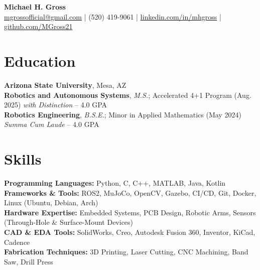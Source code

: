 \documentclass[10pt]{article}
\begin{document}
\begin{center}
    {\LARGE \textbf{Michael H. Gross}} \\
    \href{mailto:mgrossofficial@gmail.com}{mgrossofficial@gmail.com} | (520) 419-9061 | 
    \href{https://www.linkedin.com/in/mhgross}{linkedin.com/in/mhgross} | \href{https://github.com/MGross21}{github.com/MGross21}
\end{center}

\section*{Education}
\textbf{Arizona State University}, Mesa, AZ \\
\textbf{Robotics and Autonomous Systems}, \textit{M.S.}; Accelerated 4+1 Program (Aug. 2025) \hfill \textit{with Distinction} -- 4.0 GPA \\
\textbf{Robotics Engineering}, \textit{B.S.E.}; Minor in Applied Mathematics (May 2024) \hfill \textit{Summa Cum Laude} -- 4.0 GPA

\section*{Skills}
\textbf{Programming Languages:} Python, C, C++, MATLAB, Java, Kotlin \\
\textbf{Frameworks \& Tools:} ROS2, MuJoCo, OpenCV, Gazebo, CI/CD, Git, Docker, Linux (Ubuntu, Debian, Arch) \\
\textbf{Hardware Expertise:} Embedded Systems, PCB Design, Robotic Arms, Sensors (Through-Hole \& Surface-Mount Devices)\\
\textbf{CAD \& EDA Tools:} SolidWorks, Creo, Autodesk Fusion 360, Inventor, KiCad, Cadence \\
\textbf{Fabrication Techniques:} 3D Printing, Laser Cutting, CNC Machining, Band Saw, Drill Press
\end{document}
